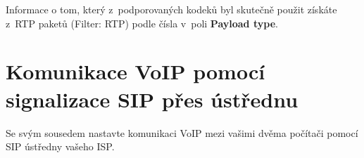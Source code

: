 \noindent Informace o tom, který z podporovaných kodeků byl skutečně použit získáte z RTP paketů (Filter: RTP) podle čísla v poli {\bf Payload type}.
\begin{figure}[h!]
  \centering
\end{figure}


\section{Komunikace VoIP pomocí signalizace SIP přes ústřednu}
Se svým sousedem nastavte komunikaci VoIP mezi vašimi dvěma počítači pomocí SIP ústředny vašeho ISP.

